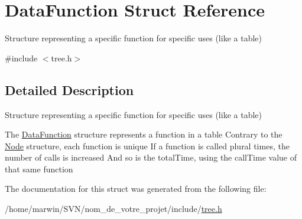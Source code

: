 \hypertarget{struct_data_function}{\section{Data\-Function Struct Reference}
\label{struct_data_function}
}


Structure representing a specific function for specific uses (like a table)  




{\ttfamily \#include $<$tree.\-h$>$}



\subsection{Detailed Description}
Structure representing a specific function for specific uses (like a table) 

The \hyperlink{struct_data_function}{Data\-Function} structure represents a function in a table Contrary to the \hyperlink{struct_node}{Node} structure, each function is unique If a function is called plural times, the number of calls is increased And so is the total\-Time, using the call\-Time value of that same function 

The documentation for this struct was generated from the following file\-:\begin{DoxyCompactItemize}
\item 
/home/marwin/\-S\-V\-N/nom\-\_\-de\-\_\-votre\-\_\-projet/include/\hyperlink{tree_8h}{tree.\-h}\end{DoxyCompactItemize}
